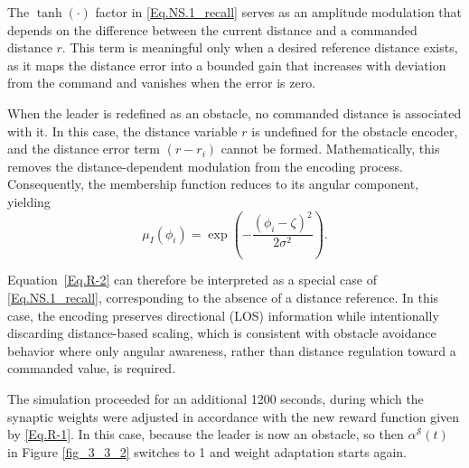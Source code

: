 The $\tanh(\cdot)$ factor in \eqref{Eq.NS.1_recall} serves as an amplitude modulation that depends on the difference between the current distance and a commanded distance $r$. This term is meaningful only when a desired reference distance exists, as it maps the distance error into a bounded gain that increases with deviation from the command and vanishes when the error is zero.

When the leader is redefined as an obstacle, no commanded distance is associated with it. In this case, the distance variable $r$ is undefined for the obstacle encoder, and the distance error term $(r - r_i)$ cannot be formed. Mathematically, this removes the distance-dependent modulation from the encoding process. Consequently, the membership function reduces to its angular component, yielding
\begin{equation} \label{Eq.R-2}
    \mu_{I}(\phi_{i}) =
    \exp\!\left(-\frac{(\phi_{i}-\zeta)^2}{2\sigma^2}\right).
\end{equation}

Equation~\eqref{Eq.R-2} can therefore be interpreted as a special case of \eqref{Eq.NS.1_recall}, corresponding to the absence of a distance reference. In this case, the encoding preserves directional (LOS) information while intentionally discarding distance-based scaling, which is consistent with obstacle avoidance behavior where only angular awareness, rather than distance regulation toward a commanded value, is required.




The simulation proceeded for an additional 1200 seconds, during which the synaptic weights were adjusted in accordance with the new reward function given by \eqref{Eq.R-1}. In this case, because the leader is now an obstacle, so then \(\alpha^{\mathcal{S}}(t)\) in Figure \ref{fig_3_3_2} switches to 1 and weight adaptation starts again.

